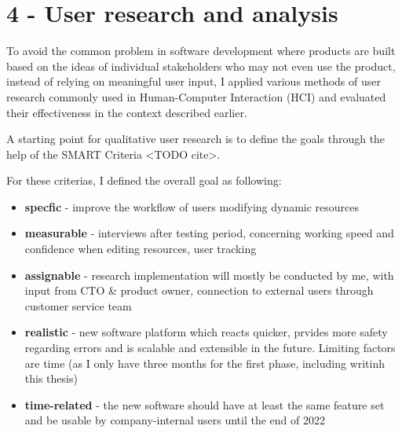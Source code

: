 %
\chapter{4 - User research and analysis}
\label{chap:chapters}



To avoid the common problem in software development where products are built based on the ideas of individual stakeholders who may not even use the product,
instead of relying on meaningful user input,
I applied various methods of user research commonly used in Human-Computer Interaction (HCI) and evaluated their effectiveness in the context described earlier.

A starting point for qualitative user research is to define the goals through the help of the SMART Criteria <TODO cite>.

For these criterias, I defined the overall goal as following:

\begin{itemize}
  \item \textbf{specfic} - improve the workflow of users modifying dynamic resources
  \item \textbf{measurable} - interviews after testing period, concerning working speed and confidence when editing resources, user tracking
  \item \textbf{assignable} - research implementation will mostly be conducted by me, with input from CTO \& product owner, connection to external users through customer service team
  \item \textbf{realistic} - new software platform which reacts quicker, prvides more safety regarding errors and is scalable and extensible in the future. Limiting factors are time (as I only have three months for the first phase, including writinh this thesis)
  \item \textbf{time-related} - the new software should have at least the same feature set and be usable by company-internal users until the end of 2022
\end{itemize}
